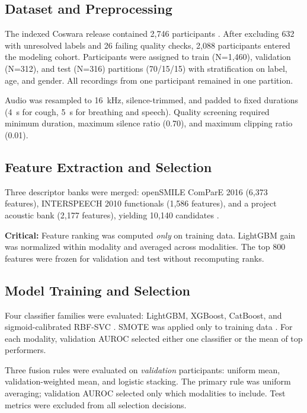 \documentclass[conference]{IEEEtran}
\begin{document}
\subsection{Dataset and Preprocessing}

The indexed Coswara release contained 2,746 participants \cite{bhattacharya2023coswara}. After excluding 632 with unresolved labels and 26 failing quality checks, 2,088 participants entered the modeling cohort. Participants were assigned to train (N=1,460), validation (N=312), and test (N=316) partitions (70/15/15) with stratification on label, age, and gender. All recordings from one participant remained in one partition.

Audio was resampled to 16~kHz, silence-trimmed, and padded to fixed durations (4~s for cough, 5~s for breathing and speech). Quality screening required minimum duration, maximum silence ratio (0.70), and maximum clipping ratio (0.01).

\subsection{Feature Extraction and Selection}

Three descriptor banks were merged: openSMILE ComParE 2016 (6,373 features), INTERSPEECH 2010 functionals (1,586 features), and a project acoustic bank (2,177 features), yielding 10,140 candidates \cite{eyben2010opensmile,schuller2013compare}.

\textbf{Critical:} Feature ranking was computed \emph{only} on training data. LightGBM gain was normalized within modality and averaged across modalities. The top 800 features were frozen for validation and test without recomputing ranks.

\subsection{Model Training and Selection}

Four classifier families were evaluated: LightGBM, XGBoost, CatBoost, and sigmoid-calibrated RBF-SVC \cite{ke2017lightgbm,chen2016xgboost,prokhorenkova2018catboost}. SMOTE was applied only to training data \cite{chawla2002smote}. For each modality, validation AUROC selected either one classifier or the mean of top performers.

Three fusion rules were evaluated on \emph{validation} participants: uniform mean, validation-weighted mean, and logistic stacking. The primary rule was uniform averaging; validation AUROC selected only which modalities to include. Test metrics were excluded from all selection decisions.
\end{document}
